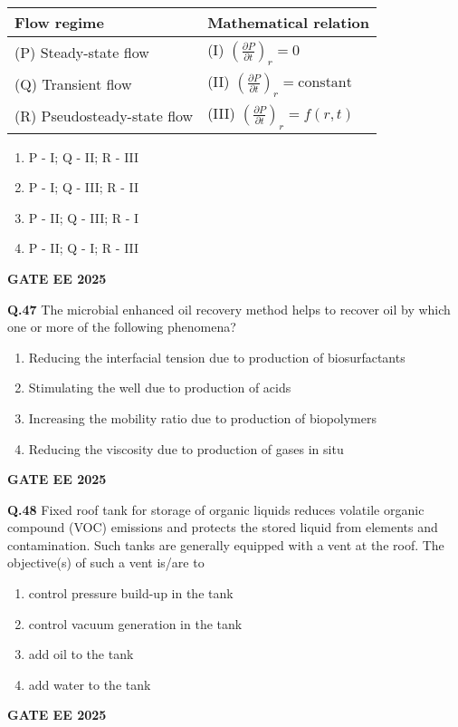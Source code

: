 \documentclass{article}
\begin{document}
\begin{tabular}{|l|l|}
\hline
Flow regime & Mathematical relation \\
\hline
(P) Steady-state flow & (I) $\left(\frac{\partial P}{\partial t}\right)_r = 0$ \\
(Q) Transient flow & (II) $\left(\frac{\partial P}{\partial t}\right)_r = \text{constant}$ \\
(R) Pseudosteady-state flow & (III) $\left(\frac{\partial P}{\partial t}\right)_r = f(r,t)$ \\
\hline
\end{tabular}

\begin{enumerate}[label=(\Alph*)]
    \item P - I; Q - II; R - III
    \item P - I; Q - III; R - II
    \item P - II; Q - III; R - I
    \item P - II; Q - I; R - III
\end{enumerate}
\textbf{GATE EE 2025}

\vspace{0.5cm}

\textbf{Q.47} The microbial enhanced oil recovery method helps to recover oil by which one or more of the following phenomena?
\begin{enumerate}[label=(\Alph*)]
    \item Reducing the interfacial tension due to production of biosurfactants
    \item Stimulating the well due to production of acids
    \item Increasing the mobility ratio due to production of biopolymers
    \item Reducing the viscosity due to production of gases in situ
\end{enumerate}
\textbf{GATE EE 2025}


\vspace{0.5cm}

\textbf{Q.48} Fixed roof tank for storage of organic liquids reduces volatile organic compound (VOC) emissions and protects the stored liquid from elements and contamination. Such tanks are generally equipped with a vent at the roof. The objective(s) of such a vent is/are to
\begin{enumerate}[label=(\Alph*)]
    \item control pressure build-up in the tank
    \item control vacuum generation in the tank
    \item add oil to the tank
    \item add water to the tank
\end{enumerate}
\textbf{GATE EE 2025}
\end{document}
